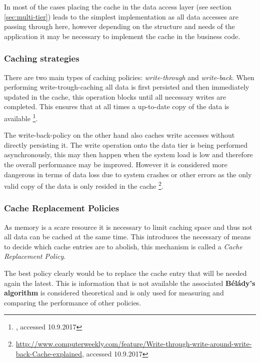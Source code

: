 In most of the cases placing the cache in the data access layer (see section \ref{sec:multi-tier}) leads to the simplest implementation as all data accesses are passing through here, however depending on the structure and needs of the application it may be necessary to implement the cache in the business code.

\subsubsection{Caching strategies}
There are two main types of caching policies: \emph{write-through} and \emph{write-back}. When performing write-trough-caching all data is first persisted and then immediately updated in the cache, this operation blocks until all necessary writes are completed. This ensures that at all times a up-to-date copy of the data is available \footnote{\href{http://searchsolidstatestorage.techtarget.com/answer/Comparing-write-through-write-back-and-write-around-caching}, accessed 10.9.2017}. 

The write-back-policy on the other hand also caches write accesses without directly persisting it. The write operation onto the data tier is being performed asynchronously, this may then happen when the system load is low and therefore the overall performance may be improved. However it is considered more dangerous in terms of data loss due to system crashes or other errors as the only valid copy of the data is only resided in the cache  \footnote{\href{http://www.computerweekly.com/feature/Write-through-write-around-write-back-Cache-explained}{http://www.computerweekly.com/feature/Write-through-write-around-write-back-Cache-explained}, accessed 10.9.2017}.

\subsubsection{Cache Replacement Policies}
As memory is a scare resource it is necessary to limit caching space and thus not all data can be cached at the same time. This introduces the necessary of means to decide which cache entries are to abolish, this mechanism is called a \emph{Cache Replacement Policy}. 

The best policy clearly would be to replace the cache entry that will be needed again the latest. This is information that is not available the associated \textbf{Bélády's algorithm} is considered theoretical and is only used for measuring and comparing the performance of other policies.


